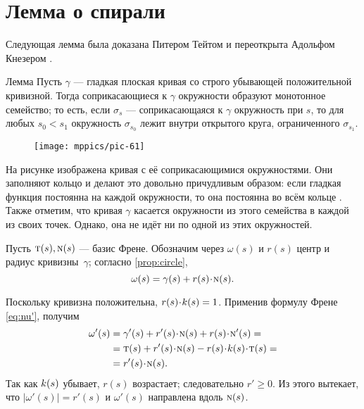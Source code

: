 \section{Лемма о спирали}
\label{spiral}

Следующая лемма была доказана Питером Тейтом \cite{tait}
и переоткрыта Адольфом Кнезером \cite{kneser}.


\begin{thm}{Лемма}\label{lem:spiral}
Пусть $\gamma$ --- гладкая плоская кривая со строго убывающей положительной кривизной.
Тогда соприкасающиеся к $\gamma$ окружности образуют монотонное семейство;
то есть, если $\sigma_s$ --- соприкасающаяся к $\gamma$ окружность при $s$,
то для любых $s_0<s_1$ окружность $\sigma_{s_0}$ лежит внутри открытого круга, ограниченного $\sigma_{s_1}$.
\end{thm}

{

\begin{wrapfigure}{r}{31 mm}
\vskip-0mm
\texttt{[image: mppics/pic-61]}
\end{wrapfigure}

На рисунке изображена кривая с её соприкасающимися окружностями.
Они заполняют кольцо и делают это довольно причудливым образом: если гладкая функция постоянна на каждой окружности, то она постоянна во всём кольце \cite[Лекция 10]{fuchs-tabachnikov}.
Также отметим, что кривая $\gamma$ касается окружности из этого семейства в каждой из своих точек.
Однако, она не идёт ни по одной из этих окружностей.

}



Пусть $\text{\sc{t}}(s),\text{\sc{n}}(s)$ --- базис Френе.
Обозначим через $\omega(s)$ и $r(s)$
центр и радиус кривизны~$\gamma$;
согласно \ref{prop:circle},
\[\omega(s)=\gamma(s)+r(s)\cdot \norm(s).\]

Поскольку кривизна положительна, $r(s)\cdot\skur(s)=1$.
Применив формулу Френе \ref{eq:nu'}, получим
\begin{align*}
\omega'(s)&=\gamma'(s)+r'(s)\cdot \norm(s)+r(s)\cdot \norm'(s)=
\\
&=\tan(s)+r'(s)\cdot \norm(s)-r(s)\cdot \skur(s)\cdot \tan(s)=
\\
&=r'(s)\cdot \norm(s).
\end{align*}
Так как $k(s)$ убывает, $r(s)$ возрастает;
следовательно $r'\ge 0$.
Из этого вытекает, что $|\omega'(s)|= r'(s)$ и $\omega'(s)$ направлена вдоль $\text{\sc{n}}(s)$.

